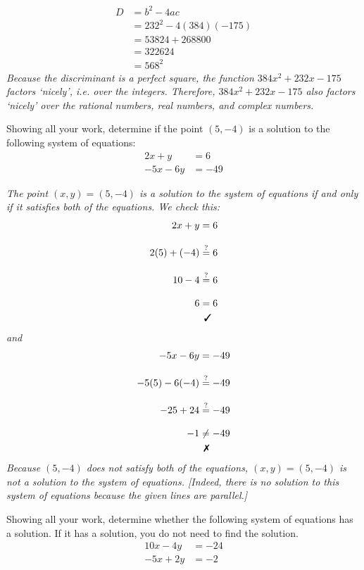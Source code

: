 \documentclass[12pt,letterpaper]{exam}
\begin{document}
\begin{questions}
{\itshape
	\[
	\begin{aligned}
	D&= b^2 - 4ac \\[0.3cm]
	&= 232^2 - 4(384)(-175) \\[0.3cm]
	&= 53824 + 268800 \\[0.3cm]
	&= 322624 \\[0.3cm]
	&= 568^2
	\end{aligned}
	\] \pspace
Because the discriminant is a perfect square, the function $384x^2 + 232x - 175$ factors `nicely', i.e. over the integers. Therefore, $384x^2 + 232x - 175$ also factors `nicely' over the rational numbers, real numbers, and complex numbers. 
}



\newpage
\question[10] Showing all your work, determine if the point $(5, -4)$ is a solution to the following system of equations:
	\[
	\begin{aligned}
	2x + y&= 6 \\[0.3cm]
	-5x - 6y&= -49
	\end{aligned}
	\] \pspace

{\itshape The point $(x, y)= (5, -4)$ is a solution to the system of equations if and only if it satisfies both of the equations. We check this:
	\[
	\begin{aligned}
	2x + y&= 6 \\[0.3cm]
	2(5) + (-4)&\stackrel{?}{=} 6 \\[0.3cm]
	10 - 4&\stackrel{?}{=} 6 \\[0.3cm]
	6&= 6 \\
	&\;\,\text{\cmark}
	\end{aligned}
	\]
and
	\[
	\begin{aligned}
	-5x - 6y&= -49 \\[0.3cm]
	-5(5) - 6(-4)&\stackrel{?}{=} -49 \\[0.3cm]
	-25 + 24&\stackrel{?}{=} -49 \\[0.3cm]
	-1&\neq -49 \\
	&\;\,\text{\xmark}
	\end{aligned}
	\] \pspace
Because $(5, -4)$ does not satisfy both of the equations, $(x, y)= (5, -4)$ is not a solution to the system of equations. [Indeed, there is no solution to this system of equations because the given lines are parallel.]
}



\newpage
\question[10] Showing all your work, determine whether the following system of equations has a solution. If it has a solution, you do not need to find the solution.
	\[
	\begin{aligned}
	10x - 4y&= -24 \\[0.3cm]
	-5x + 2y&= -2
	\end{aligned}
	\] \pspace


\end{questions}
\end{document}
